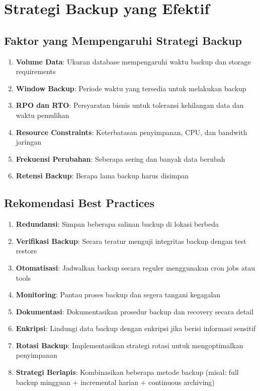 \section{Strategi Backup yang Efektif}

\subsection{Faktor yang Mempengaruhi Strategi Backup}
\begin{enumerate}
    \item \textbf{Volume Data}: Ukuran database mempengaruhi waktu backup dan storage requirements
    \item \textbf{Window Backup}: Periode waktu yang tersedia untuk melakukan backup
    \item \textbf{RPO dan RTO}: Persyaratan bisnis untuk toleransi kehilangan data dan waktu pemulihan
    \item \textbf{Resource Constraints}: Keterbatasan penyimpanan, CPU, dan bandwith jaringan
    \item \textbf{Frekuensi Perubahan}: Seberapa sering dan banyak data berubah
    \item \textbf{Retensi Backup}: Berapa lama backup harus disimpan
\end{enumerate}

\subsection{Rekomendasi Best Practices}
\begin{enumerate}
    \item \textbf{Redundansi}: Simpan beberapa salinan backup di lokasi berbeda
    \item \textbf{Verifikasi Backup}: Secara teratur menguji integritas backup dengan test restore
    \item \textbf{Otomatisasi}: Jadwalkan backup secara reguler menggunakan cron jobs atau tools
    \item \textbf{Monitoring}: Pantau proses backup dan segera tangani kegagalan
    \item \textbf{Dokumentasi}: Dokumentasikan prosedur backup dan recovery secara detail
    \item \textbf{Enkripsi}: Lindungi data backup dengan enkripsi jika berisi informasi sensitif
    \item \textbf{Rotasi Backup}: Implementasikan strategi rotasi untuk mengoptimalkan penyimpanan
    \item \textbf{Strategi Berlapis}: Kombinasikan beberapa metode backup (misal: full backup mingguan + incremental harian + continuous archiving)
\end{enumerate}

